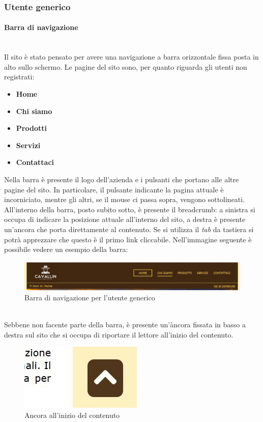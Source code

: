 \subsubsection{Utente generico}
\paragraph{Barra di navigazione}
~\\Il sito è stato pensato per avere una navigazione a barra orizzontale fissa posta in alto sullo schermo. Le pagine del sito sono, per quanto riguarda gli utenti non registrati:
\begin{itemize}
	\item \textbf{Home}
	\item \textbf{Chi siamo}
	\item \textbf{Prodotti}
	\item \textbf{Servizi}
	\item \textbf{Contattaci}
\end{itemize}
Nella barra è presente il logo dell'azienda e i pulsanti che portano alle altre pagine del sito. In particolare, il pulsante indicante la pagina attuale è incorniciato, mentre gli altri, se il mouse ci passa sopra, vengono sottolineati. All'interno della barra, posto subito sotto, è presente il breadcrumb: a sinistra si occupa di indicare la posizione attuale all'interno del sito, a destra è presente un'ancora che porta direttamente al contenuto. Se si utilizza il \emph{tab} da tastiera si potrà apprezzare che questo è il primo link cliccabile. Nell'immagine seguente è possibile vedere un esempio della barra:
\begin{figure}[h!]
	\centerline{\includegraphics[scale=0.45]{img/barra_navigazione.jpg}}
	\caption{Barra di navigazione per l'utente generico}
	\label{fig:navbarGU}
\end{figure}
~\\Sebbene non facente parte della barra, è presente un'àncora fissata in basso a destra sul sito che si occupa di riportare il lettore all'inizio del contenuto.
\begin{figure}[h!]
	\centerline{\includegraphics[scale=0.45]{img/jump_to_menu.jpg}}
	\caption{Ancora all'inizio del contenuto}
	\label{fig:anchor}
\end{figure}
